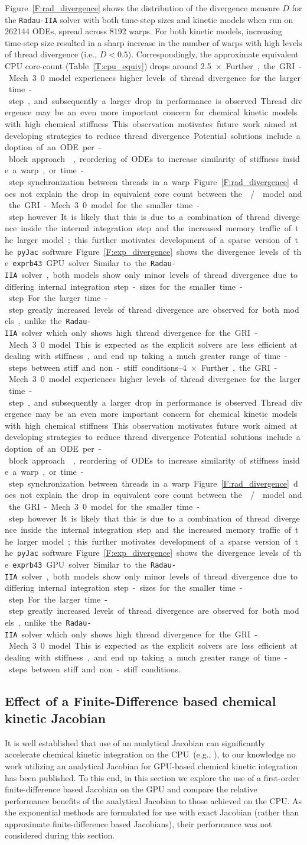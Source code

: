 \documentclass[final,twocolumn]{elsarticle}
\begin{document}
Figure~\ref{F:rad_divergence} shows the distribution of the divergence measure $D$ for the \texttt{Radau-IIA} solver with both time-step sizes and kinetic models when run on \num{262144} ODEs, spread across \num{8192} warps.
For both kinetic models, increasing time-step size resulted in a sharp increase in the number of warps with high levels of thread divergence (i.e., $D < 0.5$).
Correspondingly, the approximate equivalent CPU core-count (Table~\ref{T:cpu_equiv}) drops around \SIrange{2.5}{4}{$\times$}.
Further, the GRI-Mech 3.0 model experiences higher levels of thread divergence for the larger time-step, and subsequently a larger drop in performance is observed.
Thread divergence may be an even more important concern for chemical kinetic models with high chemical stiffness.
This observation motivates future work aimed at developing strategies to reduce thread divergence.
Potential solutions include adoption of an ODE per-block approach~\cite{Stone:2013aa}, reordering of ODEs to increase similarity of stiffness inside a warp, or time-step synchronization between threads in a warp.
Figure~\ref{F:rad_divergence} does not explain the drop in equivalent core count between the \slash{} model and the GRI-Mech 3.0 model for the smaller time-step however.
It is likely that this is due to a combination of thread divergence inside the internal integration step and the increased memory traffic of the larger model; this further motivates development of a sparse version of the \texttt{pyJac} software.

Figure~\ref{F:exp_divergence} shows the divergence levels of the \texttt{exprb43} GPU solver.
Similar to the \texttt{Radau-IIA} solver, both models show only minor levels of thread divergence due to differing internal integration step-sizes for the smaller time-step.
For the larger time-step greatly increased levels of thread divergence are observed for both models, unlike the \texttt{Radau-IIA} solver which only shows high thread divergence for the GRI-Mech 3.0 model.
This is expected as the explicit solvers are less efficient at dealing with stiffness, and end up taking a much greater range of time-steps between stiff and non-stiff conditions.

\subsection{Effect of a Finite-Difference based chemical kinetic Jacobian}
It is well established that use of an analytical Jacobian can significantly accelerate chemical kinetic integration on the CPU~(e.g., \cite{Lu:2009gh,stone2014comparison}), to our knowledge no work utilizing an analytical Jacobian for GPU-based chemical kinetic integration has been published.
To this end, in this section we explore the use of a first-order finite-difference based Jacobian on the GPU and compare the relative performance benefits of the analytical Jacobian to those achieved on the CPU.
As the exponential methods are formulated for use with exact Jacobian (rather than approximate finite-difference based Jacobians), their performance was not considered during this section.
\end{document}
